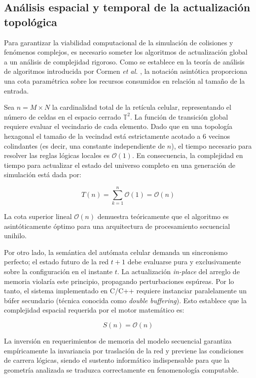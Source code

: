 \subsection{Análisis espacial y temporal de la actualización topológica}

Para garantizar la viabilidad computacional de la simulación de colisiones y fenómenos complejos, es necesario someter los algoritmos de actualización global a un análisis de complejidad rigoroso. Como se establece en la teoría de análisis de algoritmos introducida por Cormen \textit{et al.} \cite{Cormen2009}, la notación asintótica proporciona una cota paramétrica sobre los recursos consumidos en relación al tamaño de la entrada.

Sea $n = M \times N$ la cardinalidad total de la retícula celular, representando el número de celdas en el espacio cerrado $\mathbb{T}^2$. La función de transición global requiere evaluar el vecindario de cada elemento. Dado que en una topología hexagonal el tamaño de la vecindad está estrictamente acotado a 6 vecinos colindantes (es decir, una constante independiente de $n$), el tiempo necesario para resolver las reglas lógicas locales es $\mathcal{O}(1)$. En consecuencia, la complejidad en tiempo para actualizar el estado del universo completo en una generación de simulación está dada por:

\begin{equation}
    T(n) = \sum_{k=1}^{n} \mathcal{O}(1) = \mathcal{O}(n)
\end{equation}

La cota superior lineal $\mathcal{O}(n)$ demuestra teóricamente que el algoritmo es asintóticamente óptimo para una arquitectura de procesamiento secuencial unihilo. 

Por otro lado, la semántica del autómata celular demanda un sincronismo perfecto; el estado futuro de la red $t+1$ debe evaluarse pura y exclusivamente sobre la configuración en el instante $t$. La actualización \textit{in-place} del arreglo de memoria violaría este principio, propagando perturbaciones espúreas. Por lo tanto, el sistema implementado en C/C++ requiere instanciar paralelamente un búfer secundario (técnica conocida como \textit{double buffering}). Esto establece que la complejidad espacial requerida por el motor matemático es:

\begin{equation}
    S(n) = \mathcal{O}(n)
\end{equation}

La inversión en requerimientos de memoria del modelo secuencial garantiza empíricamente la invariancia por traslación de la red y previene las condiciones de carrera lógicas, siendo el sustento informático indispensable para que la geometría analizada se traduzca correctamente en fenomenología computable.

